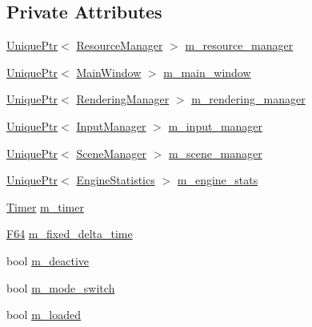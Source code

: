\subsection*{Private Attributes}
\begin{DoxyCompactItemize}
\item 
\hyperlink{namespacemage_a3316d7143a973e37adf1110f2e80ca31}{Unique\+Ptr}$<$ \hyperlink{classmage_1_1_resource_manager}{Resource\+Manager} $>$ \hyperlink{classmage_1_1_engine_ac8d94579e72983a99a78be6b9b606a28}{m\+\_\+resource\+\_\+manager}
\item 
\hyperlink{namespacemage_a3316d7143a973e37adf1110f2e80ca31}{Unique\+Ptr}$<$ \hyperlink{classmage_1_1_main_window}{Main\+Window} $>$ \hyperlink{classmage_1_1_engine_a3aea7e8c0c1247cac570334a3d3543d6}{m\+\_\+main\+\_\+window}
\item 
\hyperlink{namespacemage_a3316d7143a973e37adf1110f2e80ca31}{Unique\+Ptr}$<$ \hyperlink{classmage_1_1_rendering_manager}{Rendering\+Manager} $>$ \hyperlink{classmage_1_1_engine_a81c7475c3501f84f9bd9c7bbeaebfcb6}{m\+\_\+rendering\+\_\+manager}
\item 
\hyperlink{namespacemage_a3316d7143a973e37adf1110f2e80ca31}{Unique\+Ptr}$<$ \hyperlink{classmage_1_1_input_manager}{Input\+Manager} $>$ \hyperlink{classmage_1_1_engine_a8e9048208a6a5c5b034aaa1cbdab28bc}{m\+\_\+input\+\_\+manager}
\item 
\hyperlink{namespacemage_a3316d7143a973e37adf1110f2e80ca31}{Unique\+Ptr}$<$ \hyperlink{classmage_1_1_scene_manager}{Scene\+Manager} $>$ \hyperlink{classmage_1_1_engine_afac8085ae572d623e77b1e0847440ab4}{m\+\_\+scene\+\_\+manager}
\item 
\hyperlink{namespacemage_a3316d7143a973e37adf1110f2e80ca31}{Unique\+Ptr}$<$ \hyperlink{classmage_1_1_engine_statistics}{Engine\+Statistics} $>$ \hyperlink{classmage_1_1_engine_aa0c82f248a2fbec3fbf778665a440edc}{m\+\_\+engine\+\_\+stats}
\item 
\hyperlink{classmage_1_1_timer}{Timer} \hyperlink{classmage_1_1_engine_a8d1395822cfabf3f7acc97f28d53f231}{m\+\_\+timer}
\item 
\hyperlink{namespacemage_ad26233bbec640deda836e572c1a23708}{F64} \hyperlink{classmage_1_1_engine_a95557e1b6cba52b393c94d80d80bea4c}{m\+\_\+fixed\+\_\+delta\+\_\+time}
\item 
bool \hyperlink{classmage_1_1_engine_ab8a4b0157403708ae7d1d018a95b4c63}{m\+\_\+deactive}
\item 
bool \hyperlink{classmage_1_1_engine_aa5cb2e0b7bb2c4a9020e79ab832ee221}{m\+\_\+mode\+\_\+switch}
\item 
bool \hyperlink{classmage_1_1_engine_a2f8783761b9629dd507d0a6bc456125b}{m\+\_\+loaded}
\end{DoxyCompactItemize}
